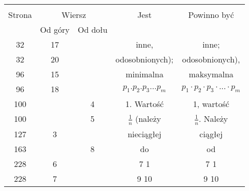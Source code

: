\documentclass[a4paper,11pt]{article}
\begin{document}
\begin{center}

  \begin{tabular}{|c|c|c|c|c|}
    \hline
    & \multicolumn{2}{c|}{} & & \\
    Strona & \multicolumn{2}{c|}{Wiersz} & Jest
                              & Powinno być \\ \cline{2-3}
    & Od góry & Od dołu & & \\
    \hline
    32  & 17 & & inne, & inne; \\
    32  & 20 & & odosobnionych); & odosobnionych), \\
    96  & 15 & & minimalna & maksymalna \\
    96  & 18 & & $p_{ 1 } . p_{ 2 } . p_{ 3 } \ldots p_{ m }$
           & $p_{ 1 } \cdot p_{ 2 } \cdot p_{ 3 } \cdot \ldots \cdot p_{ m }$ \\
    100 & &  4 & 1. Wartość & 1, wartość \\
    100 & &  5 & $\frac{ 1 }{ n }$ (należy & $\frac{ 1 }{ n }$. Należy \\
    127 &  3 & & nieciągłej & ciągłej \\
    163 & &  8 & do & od \\
    228 &  6 & & 7{ }{ }{ } 1 & 7{ }{ } 1 \\
    228 &  7 & & 9{ }{ } 10 & 9 10 \\
    \hline
  \end{tabular}

\end{center}

\vspace{\spaceOne}










\newpage

\end{document}
